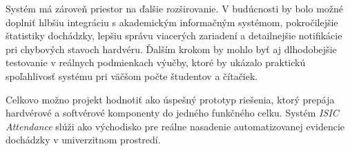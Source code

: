 Systém má zároveň priestor na ďalšie rozširovanie. V budúcnosti by bolo možné doplniť hlbšiu integráciu s akademickým informačným systémom, pokročilejšie štatistiky dochádzky, lepšiu správu viacerých zariadení a detailnejšie notifikácie pri chybových stavoch hardvéru. Ďalším krokom by mohlo byť aj dlhodobejšie testovanie v reálnych podmienkach výučby, ktoré by ukázalo praktickú spoľahlivosť systému pri väčšom počte študentov a čítačiek.

Celkovo možno projekt hodnotiť ako úspešný prototyp riešenia, ktorý prepája hardvérové a softvérové komponenty do jedného funkčného celku. Systém \textit{ISIC Attendance} slúži ako východisko pre reálne nasadenie automatizovanej evidencie dochádzky v univerzitnom prostredí.